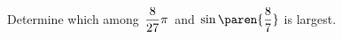 Determine which among
$\mspace{2.5mu} \dfrac{8}{27} \pi \mspace{2.5mu}$ and
$\mspace{2.5mu} \sin\paren{\dfrac{8}{7}}$
is largest.
